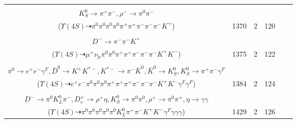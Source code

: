 \documentclass[landscape]{article}
\newcounter{rownumbers}
\newcommand\rn{\stepcounter{rownumbers}\arabic{rownumbers}}
\newcommand{\EOLP}{\\ \hline} %
\newcommand{\topoTags}[1]{#1} %
\begin{document}
\begin{longtable}{clcccc}
\rn & \makecell[l]{ $ 
\Upsilon(4S) \rightarrow B^{0} \bar{B}^{0} ,
B^{0} \rightarrow \pi^{-} K_{0}^{*+} ,
\bar{B}^{0} \rightarrow D^{+} a_{1}^{-} ,
K_{0}^{*+} \rightarrow \pi^{0} K^{+} ,
D^{+} \rightarrow \pi^{0} \pi^{+} K_{S}^{0} ,
a_{1}^{-} \rightarrow \pi^{0} \rho^{-} ,
$ \\ $
K_{S}^{0} \rightarrow \pi^{+} \pi^{-} ,
\rho^{-} \rightarrow \pi^{0} \pi^{-} 
$ \\ ($
\Upsilon(4S) \dashrightarrow \pi^{0} \pi^{0} \pi^{0} \pi^{0} \pi^{+} \pi^{+} \pi^{-} \pi^{-} \pi^{-} K^{+} 
$) } & \topoTags{1370 & }2 & 120 \EOLP

\rn & \makecell[l]{ $ 
\Upsilon(4S) \rightarrow B^{0} \bar{B}^{0} ,
B^{0} \rightarrow \mu^{+} \nu_{\mu} D^{*-} ,
\bar{B}^{0} \rightarrow \rho^{-} D^{+} ,
D^{*-} \rightarrow \pi^{0} D^{-} ,
\rho^{-} \rightarrow \pi^{0} \pi^{-} ,
D^{+} \rightarrow \pi^{+} \pi^{+} K^{-} ,
$ \\ $
D^{-} \rightarrow \pi^{-} \pi^{-} K^{+} 
$ \\ ($
\Upsilon(4S) \dashrightarrow \mu^{+} \nu_{\mu} \pi^{0} \pi^{0} \pi^{+} \pi^{+} \pi^{-} \pi^{-} \pi^{-} K^{+} K^{-} 
$) } & \topoTags{1375 & }2 & 122 \EOLP

\rn & \makecell[l]{ $ 
\Upsilon(4S) \rightarrow B^{0} \bar{B}^{0} ,
B^{0} \rightarrow \rho^{0} \bar{D}^{*0} ,
\bar{B}^{0} \rightarrow \pi^{+} \eta K^{-} ,
\rho^{0} \rightarrow \pi^{+} \pi^{-} ,
\bar{D}^{*0} \rightarrow \pi^{0} \bar{D}^{0} ,
\eta \rightarrow \pi^{0} \pi^{0} \pi^{0} ,
$ \\ $
\pi^{0} \rightarrow e^{+} e^{-} \gamma^{F} ,
\bar{D}^{0} \rightarrow K^{+} K^{*-} ,
K^{*-} \rightarrow \pi^{-} \bar{K}^{0} ,
\bar{K}^{0} \rightarrow K_{S}^{0} ,
K_{S}^{0} \rightarrow \pi^{+} \pi^{-} \gamma^{F} 
$ \\ ($
\Upsilon(4S) \dashrightarrow e^{+} e^{-} \pi^{0} \pi^{0} \pi^{0} \pi^{+} \pi^{+} \pi^{+} \pi^{-} \pi^{-} \pi^{-} K^{+} K^{-} \gamma^{F} \gamma^{F} 
$) } & \topoTags{1384 & }2 & 124 \EOLP

\rn & \makecell[l]{ $ 
\Upsilon(4S) \rightarrow B^{0} \bar{B}^{0} ,
B^{0} \rightarrow D^{*-} D_{s}^{*+} ,
\bar{B}^{0} \rightarrow \bar{K}^{0} K^{+} K^{-} \gamma^{F} ,
D^{*-} \rightarrow \pi^{0} D^{-} ,
D_{s}^{*+} \rightarrow D_{s}^{+} \gamma ,
\bar{K}^{0} \rightarrow K_{S}^{0} ,
$ \\ $
D^{-} \rightarrow \pi^{0} K_{L}^{0} \pi^{-} ,
D_{s}^{+} \rightarrow \rho^{+} \eta ,
K_{S}^{0} \rightarrow \pi^{0} \pi^{0} ,
\rho^{+} \rightarrow \pi^{0} \pi^{+} ,
\eta \rightarrow \gamma \gamma 
$ \\ ($
\Upsilon(4S) \dashrightarrow \pi^{0} \pi^{0} \pi^{0} \pi^{0} \pi^{0} K_{L}^{0} \pi^{+} \pi^{-} K^{+} K^{-} \gamma^{F} \gamma \gamma \gamma 
$) } & \topoTags{1429 & }2 & 126 \EOLP


\end{longtable}
\end{document}

